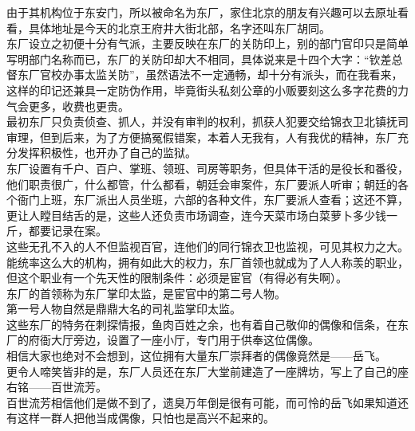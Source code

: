 \begin{multicols}{\theparacolNo}
由于其机构位于东安门，所以被命名为东厂，家住北京的朋友有兴趣可以去原址看看，具体地址是今天的北京王府井大街北部，名字还叫东厂胡同。\\

东厂设立之初便十分有气派，主要反映在东厂的关防印上，别的部门官印只是简单写明部门名称而已，东厂的关防印却大不相同，具体说来是十四个大字：“钦差总督东厂官校办事太监关防”，虽然语法不一定通畅，却十分有派头，而在我看来，这样的印记还兼具一定防伪作用，毕竟街头私刻公章的小贩要刻这么多字花费的力气会更多，收费也更贵。\\

最初东厂只负责侦查、抓人，并没有审判的权利，抓获人犯要交给锦衣卫北镇抚司审理，但到后来，为了方便搞冤假错案，本着人无我有，人有我优的精神，东厂充分发挥积极性，也开办了自己的监狱。\\

东厂设置有千户、百户、掌班、领班、司房等职务，但具体干活的是役长和番役，他们职责很广，什么都管，什么都看，朝廷会审案件，东厂要派人听审；朝廷的各个衙门上班，东厂派出人员坐班，六部的各种文件，东厂要派人查看；这还不算，更让人瞠目结舌的是，这些人还负责市场调查，连今天菜市场白菜萝卜多少钱一斤，都要记录在案。\\

这些无孔不入的人不但监视百官，连他们的同行锦衣卫也监视，可见其权力之大。\\

能统率这么大的机构，拥有如此大的权力，东厂首领也就成为了人人称羡的职业，但这个职业有一个先天性的限制条件：必须是宦官（有得必有失啊）。\\

东厂的首领称为东厂掌印太监，是宦官中的第二号人物。\\

第一号人物自然是鼎鼎大名的司礼监掌印太监。\\

这些东厂的特务在刺探情报，鱼肉百姓之余，也有着自己敬仰的偶像和信条，在东厂的府衙大厅旁边，设置了一座小厅，专门用于供奉这位偶像。\\

相信大家也绝对不会想到，这位拥有大量东厂崇拜者的偶像竟然是——岳飞。\\

更令人啼笑皆非的是，东厂人员还在东厂大堂前建造了一座牌坊，写上了自己的座右铭——百世流芳。\\

百世流芳相信他们是做不到了，遗臭万年倒是很有可能，而可怜的岳飞如果知道还有这样一群人把他当成偶像，只怕也是高兴不起来的。\\


\end{multicols}
